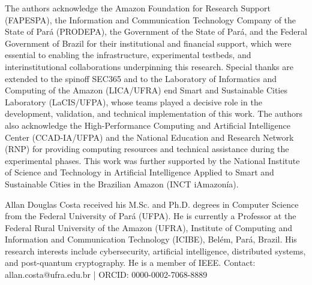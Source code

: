 \documentclass[journal,12pt,onecolumn]{IEEEtran}
\begin{document}
The authors acknowledge the Amazon Foundation for Research Support
(FAPESPA), the Information and Communication Technology Company of the
State of Par\'{a} (PRODEPA), the Government of the State of Par\'{a},
and the Federal Government of Brazil for their institutional and
financial support, which were essential to enabling the infrastructure,
experimental testbeds, and interinstitutional collaborations
underpinning this research. Special thanks are extended to the spinoff
SEC365 and to the Laboratory of Informatics and Computing of the Amazon
(LICA/UFRA) end Smart and Sustainable Cities Laboratory (LaCIS/UFPA),
whose teams played a decisive role in the development, validation, and
technical implementation of this work. The authors also acknowledge the
High-Performance Computing and Artificial Intelligence Center
(CCAD-IA/UFPA) and the National Education and Research Network (RNP)
for providing computing resources and technical assistance during the
experimental phases. This work was further supported by the National
Institute of Science and Technology in Artificial Intelligence Applied
to Smart and Sustainable Cities in the Brazilian Amazon
(INCT iAmazon\'{i}a).

\ifCLASSOPTIONcaptionsoff
  \newpage
\fi




\begin{IEEEbiographynophoto}{Allan Douglas Costa}
received his M.Sc. and Ph.D. degrees in Computer Science from the
Federal University of Par\'{a} (UFPA). He is currently a Professor at
the Federal Rural University of the Amazon (UFRA), Institute of
Computing and Information and Communication Technology (ICIBE), Bel\'{e}m,
Par\'{a}, Brazil. His research interests include cybersecurity, artificial
intelligence, distributed systems, and post-quantum cryptography. He is
a member of IEEE.
Contact: allan.costa@ufra.edu.br | ORCID: 0000-0002-7068-8889
\end{IEEEbiographynophoto}
\end{document}
